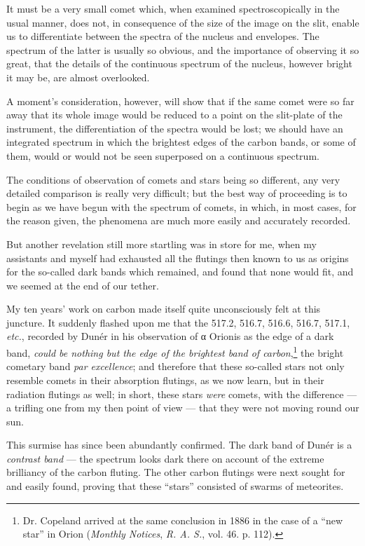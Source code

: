 \documentclass[a4paper, 12pt, oneside, polutonikogreek, english]{article}
\begin{document}
It must be a very small comet which, when examined spectroscopically in the usual manner, does not, in consequence of the size of the image on the slit, enable us to differentiate between the spectra of the nucleus and envelopes. The spectrum of the latter is usually so obvious, and the importance of observing it so great, that the details of the continuous spectrum of the nucleus, however bright it may be, are almost overlooked.

A moment's consideration, however, will show that if the same comet were so far away that its whole image would be reduced to a point on the slit-plate of the instrument, the differentiation of the spectra would be lost; we should have an integrated spectrum in which the brightest edges of the carbon bands, or some of them, would or would not be seen superposed on a continuous spectrum.

The conditions of observation of comets and stars being so different, any very detailed comparison is really very difficult; but the best way of proceeding is to begin as we have begun with the spectrum of comets, in which, in most cases, for the reason given, the phenomena are much more easily and accurately recorded.

But another revelation still more startling was in store for me, when my assistants and myself had exhausted all the flutings then known to us as origins for the so-called dark bands which remained, and found that none would fit, and we seemed at the end of our tether.

My ten years' work on carbon made itself quite unconsciously felt at this juncture. It suddenly flashed upon me that the 517.2, 516.7, 516.6, 516.7, 517.1, \emph{etc.}, recorded by Dunér in his observation of α Orionis as the edge of a dark band, \emph{could be nothing but the edge of the brightest band of carbon},\footnote{Dr. Copeland arrived at the same conclusion in 1886 in the case of a ``new star'' in Orion (\emph{Monthly Notices}, \emph{R. A. S.}, vol. 46. p. 112).} the bright cometary band \emph{par excellence}; and therefore that these so-called stars not only resemble comets in their absorption flutings, as we now learn, but in their radiation flutings as well; in short, these stars \emph{were} comets, with the difference --- a trifling one from my then point of view --- that they were not moving round our sun.

This surmise has since been abundantly confirmed. The dark band of Dunér is a \emph{contrast band} --- the spectrum looks dark there on account of the extreme brilliancy of the carbon fluting. The other carbon flutings were next sought for and easily found, proving that these ``stars'' consisted of swarms of meteorites.
\end{document}
